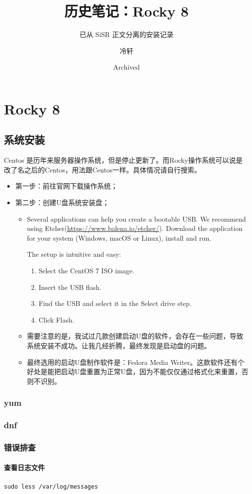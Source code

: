 \documentclass[cn,11pt,chinese]{elegantbook}
\title{历史笔记：Rocky 8}
\subtitle{已从 SiSR 正文分离的安装记录}
\author{冷轩}
\date{Archived}
\begin{document}
\maketitle
\frontmatter
\tableofcontents
\mainmatter

\part{Rocky 8}
\chapter{系统安装}
Centos 是历年来服务器操作系统，但是停止更新了。而Rocky操作系统可以说是改了名之后的Centos，用法跟Centos一样。具体情况请自行搜索。

\begin{itemize}
\item 第一步：前往官网下载操作系统；

\item 第二步：创建U盘系统安装盘；
\begin{itemize}
\item Several applications can help you create a bootable USB. We recommend using Etcher(\url{https://www.balena.io/etcher/}). Download the application for your system (Windows, macOS or Linux), install and run.

The setup is intuitive and easy:
\begin{enumerate}
\item Select the CentOS 7 ISO image.
\item Insert the USB flash.
\item Find the USB and select it in the Select drive step.
\item Click Flash.
\end{enumerate}

\item 需要注意的是，我试过几款创建启动U盘的软件，会存在一些问题，导致系统安装不成功。让我几经折腾，最终发现是启动盘的问题。

\item 最终选用的启动U盘制作软件是：Fedora Media Writer。这款软件还有个好处是能把启动U盘重置为正常U盘，因为不能仅仅通过格式化来重置，否则不识别。
\end{itemize}

\end{itemize}



\section{yum}


\section{dnf}


\section{错误排查}
\subsection{查看日志文件}
\verb|sudo less /var/log/messages|
\end{document}
